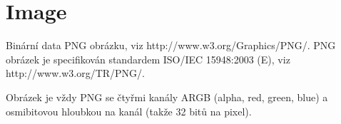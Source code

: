 \section{Image}
\label{connection.data_types.image}

Binární data PNG obrázku, viz http://www.w3.org/Graphics/PNG/. PNG obrázek je specifikován standardem ISO/IEC 15948:2003 (E), viz http://www.w3.org/TR/PNG/.

Obrázek je vždy PNG se čtyřmi kanály ARGB (alpha, red, green, blue) a osmibitovou hloubkou na kanál (takže 32 bitů na pixel).